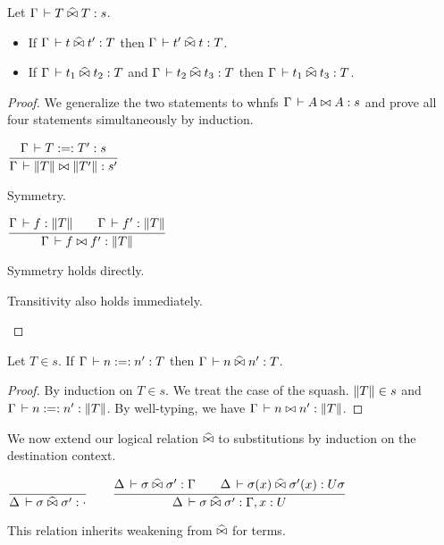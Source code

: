 \documentclass[a4paper,english]{lipics-utf8x}
\begin{document}
  \begin{lemma}
    \label{lem:s-per}
    Let $\Gamma \,\vdash T \mathrel{\widehat{\bowtie}} T : s$.
    \leavevmode
    \begin{itemize}
      \item If $\Gamma \,\vdash t \mathrel{\widehat{\bowtie}} t' : T$ then $\Gamma \,\vdash t' \mathrel{\widehat{\bowtie}} t : T$.
      \item If $\Gamma \,\vdash t_1 \mathrel{\widehat{\bowtie}} t_2 : T$ and $\Gamma \,\vdash t_2 \mathrel{\widehat{\bowtie}} t_3 : T$
      then $\Gamma \,\vdash t_1 \mathrel{\widehat{\bowtie}} t_3 : T$.
    \end{itemize}
  \end{lemma}

  \begin{proof}
    We generalize the two statements to whnfs $\Gamma \,\vdash A \mathrel{\bowtie} A : s$ and
    prove all four statements simultaneously by induction.

    \begin{center}
    \(
      \ru{\Gamma \der T :=: T' : s
        }{\Gamma \der \squash{T} \Er \squash{T'} : s'}
    \)
    \end{center}

    \begin{caselist}
      \nextcase Symmetry.
      \begin{center}
      \(
        \ru{\Gamma \der f : \squash{T} \qquad
            \Gamma \der f' : \squash{T}
          }{\Gamma \der f \Er f' : \squash{T}}
      \)
      \end{center}
      Symmetry holds directly.

      \nextcase Transitivity also holds immediately.
    \end{caselist}
  \end{proof}

  \begin{lemma}
    Let $T \in s$.
    If $\Gamma \,\vdash n :=: n' : T$ then $\Gamma \,\vdash n \mathrel{\widehat{\bowtie}} n' : T$.
  \end{lemma}

  \begin{proof}
    By induction on $T \in s$. We treat the case of the squash.
    $\|T\| \in s$ and $\Gamma \,\vdash n :=: n' : \|T\|$.
    By well-typing, we have $\Gamma \,\vdash n \mathrel{\bowtie} n' : \|T\|$.
  \end{proof}


  We now extend our logical relation $\mathrel{\widehat{\bowtie}}$ to substitutions by
  induction on the destination context.
  \begin{center}
  \(
    \ru{}{\Delta \der \sigma \hEr \sigma' : \cdot}
    \qquad
    \ru{\Delta \der \sigma \hEr \sigma' : \Gamma \qquad
        \Delta \der \sigma(x) \hEr \sigma'(x) : U \sigma
      }{\Delta \der \sigma \hEr \sigma' : \Gamma, x:U}
  \)
  \end{center}
  This relation inherits weakening from $\mathrel{\widehat{\bowtie}}$ for terms.
\end{document}
